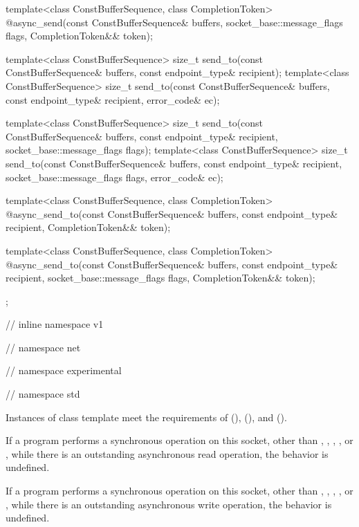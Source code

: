 \begin{codeblock}
{{{{{    template<class ConstBufferSequence, class CompletionToken>
      @\DEDUCED@ async_send(const ConstBufferSequence& buffers,
                         socket_base::message_flags flags,
                         CompletionToken&& token);

    template<class ConstBufferSequence>
      size_t send_to(const ConstBufferSequence& buffers,
                     const endpoint_type& recipient);
    template<class ConstBufferSequence>
      size_t send_to(const ConstBufferSequence& buffers,
                     const endpoint_type& recipient, error_code& ec);

    template<class ConstBufferSequence>
      size_t send_to(const ConstBufferSequence& buffers,
                     const endpoint_type& recipient,
                     socket_base::message_flags flags);
    template<class ConstBufferSequence>
      size_t send_to(const ConstBufferSequence& buffers,
                     const endpoint_type& recipient,
                     socket_base::message_flags flags, error_code& ec);

    template<class ConstBufferSequence, class CompletionToken>
      @\DEDUCED@ async_send_to(const ConstBufferSequence& buffers,
                            const endpoint_type& recipient,
                            CompletionToken&& token);

    template<class ConstBufferSequence, class CompletionToken>
      @\DEDUCED@ async_send_to(const ConstBufferSequence& buffers,
                            const endpoint_type& recipient,
                            socket_base::message_flags flags,
                            CompletionToken&& token);
  };

} // inline namespace v1
} // namespace net
} // namespace experimental
} // namespace std
\end{codeblock}

\pnum
Instances of class template  meet the requirements of  (),  (), and  ().

\pnum
If a program performs a synchronous operation on this socket, other than , , , , or , while there is an outstanding asynchronous read operation, the behavior is undefined.

\pnum
If a program performs a synchronous operation on this socket, other than , , , , or , while there is an outstanding asynchronous write operation, the behavior is undefined.

